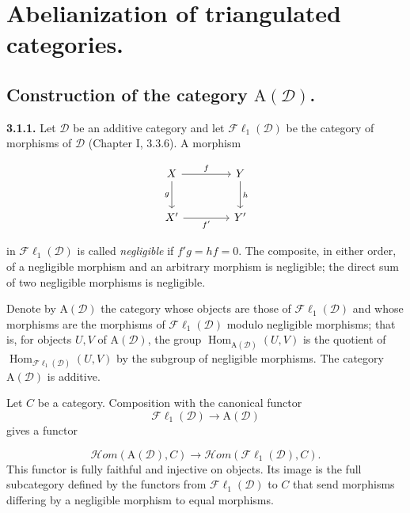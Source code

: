 \clearpage
{}%
\begingroup
\small
\setlength{\parskip}{0pt}%
\setlength{\emergencystretch}{1.5em}%

\section{Abelianization of triangulated categories.}

\subsection{Construction of the category
\texorpdfstring{$\mathrm A(\mathcal D)$}{A(D)}.}

\noindent\textbf{3.1.1.}\quad
Let $\mathcal D$ be an additive category and let
$\mathcal{F}\ell_1(\mathcal D)$ be the category of morphisms of $\mathcal D$
(Chapter I, 3.3.6). A morphism

\[
\begin{tikzcd}[column sep=4.2em,row sep=2.5em]
X \arrow[r,"f"] \arrow[d,"g"'] & Y \arrow[d,"h"] \\
X' \arrow[r,"f'"'] & Y'
\end{tikzcd}
\]

\noindent in $\mathcal{F}\ell_1(\mathcal D)$ is called \emph{negligible} if
$f'g=hf=0$. The composite, in either order, of a negligible morphism and an
arbitrary morphism is negligible; the direct sum of two negligible morphisms
is negligible.

Denote by $\mathrm A(\mathcal D)$ the category whose objects are those of
$\mathcal{F}\ell_1(\mathcal D)$ and whose morphisms are the morphisms of
$\mathcal{F}\ell_1(\mathcal D)$ modulo negligible morphisms; that is, for
objects $U,V$ of $\mathrm A(\mathcal D)$, the group
$\operatorname{Hom}_{\mathrm A(\mathcal D)}(U,V)$ is the quotient of
$\operatorname{Hom}_{\mathcal{F}\ell_1(\mathcal D)}(U,V)$ by the subgroup of
negligible morphisms. The category $\mathrm A(\mathcal D)$ is additive.

Let $C$ be a category. Composition with the canonical functor
\[
\mathcal{F}\ell_1(\mathcal D)\longrightarrow\mathrm A(\mathcal D)
\]
gives a functor

\[
\mathcal H\!om(\mathrm A(\mathcal D),C)
\longrightarrow
\mathcal H\!om(\mathcal{F}\ell_1(\mathcal D),C).
\tag{3.1.1.1}
\]
This functor is fully faithful and injective on objects. Its image is the full
subcategory defined by the functors from $\mathcal{F}\ell_1(\mathcal D)$ to
$C$ that send morphisms differing by a negligible morphism to equal
morphisms.

